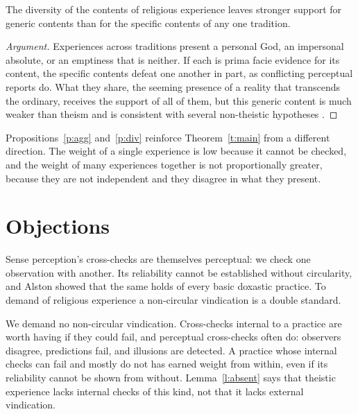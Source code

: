 \documentclass{situationist-preprint}
\begin{document}
\begin{proposition}[Diversity]\label{p:div}
The diversity of the contents of religious experience leaves stronger support for generic contents than for the specific contents of any one tradition.
\end{proposition}

\begin{proof}[Argument]
Experiences across traditions present a personal God, an impersonal absolute, or an emptiness that is neither. If each is prima facie evidence for its content, the specific contents defeat one another in part, as conflicting perceptual reports do. What they share, the seeming presence of a reality that transcends the ordinary, receives the support of all of them, but this generic content is much weaker than theism and is consistent with several non-theistic hypotheses \citep{Hick1989}.
\end{proof}

Propositions~\ref{p:agg} and~\ref{p:div} reinforce Theorem~\ref{t:main} from a different direction. The weight of a single experience is low because it cannot be checked, and the weight of many experiences together is not proportionally greater, because they are not independent and they disagree in what they present.

\section{Objections}

\begin{objection}
Sense perception's cross-checks are themselves perceptual: we check one observation with another. Its reliability cannot be established without circularity, and Alston showed that the same holds of every basic doxastic practice. To demand of religious experience a non-circular vindication is a double standard.
\end{objection}

\begin{reply}
We demand no non-circular vindication. Cross-checks internal to a practice are worth having if they could fail, and perceptual cross-checks often do: observers disagree, predictions fail, and illusions are detected. A practice whose internal checks can fail and mostly do not has earned weight from within, even if its reliability cannot be shown from without. Lemma~\ref{l:absent} says that theistic experience lacks internal checks of this kind, not that it lacks external vindication.
\end{reply}
\end{document}
